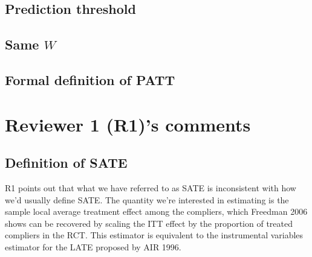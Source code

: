 \documentclass[hidelinks,12pt,letterpaper]{article}
\begin{document}
\subsection{Prediction threshold}

\subsection{Same $W$}

\subsection{Formal definition of PATT}

\section{Reviewer 1 (R1)'s comments}

\subsection{Definition of SATE} \label{SATE-def}

R1 points out that what we have referred to as SATE is inconsistent with how we'd usually define SATE. The quantity we're interested in estimating is the sample local average treatment effect among the compliers, which Freedman 2006 shows can be recovered by scaling the ITT effect by the proportion of treated compliers in the RCT. This estimator is equivalent to the instrumental variables estimator for the LATE proposed by AIR 1996.
\end{document}
